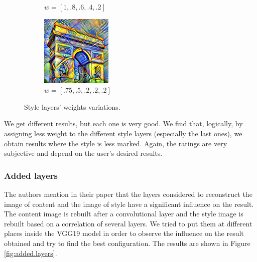 \documentclass[twocolumn,superscriptaddress,aps, floatfix]{revtex4-1}
\begin{document}
\begin{figure}[ht]
\begin{subfigure}[b]{0.13\textwidth}
            \caption{$w = [1, .8, .6, .4, .2]$}
        \end{subfigure}
        \hfill
        \begin{subfigure}[b]{0.13\textwidth}
            \centering
            \includegraphics[width=\textwidth]{resources/png/weights/sun-trees-paris-high-decreasing-weights.png}
            \caption{$w = [.75, .5, .2, .2, .2]$}
        \end{subfigure}
        \caption{Style layers' weights variations.}
        \label{fig:weights.style.layers}
    \end{figure}
    
    We get different results, but each one is very good. We find that, logically, by assigning less weight to the different style layers (especially the last ones), we obtain results where the style is less marked. Again, the ratings are very subjective and depend on the user's desired results.
    
    \subsubsection{Added layers}
    
    The authors mention in their paper that the layers considered to reconstruct the image of content and the image of style have a significant influence on the result. The content image is rebuilt after a convolutional layer and the style image is rebuilt based on a correlation of several layers. We tried to put them at different places inside the VGG19 model in order to observe the influence on the result obtained and try to find the best configuration. The results are shown in Figure \ref{fig:added.layers}.
    
\end{document}

